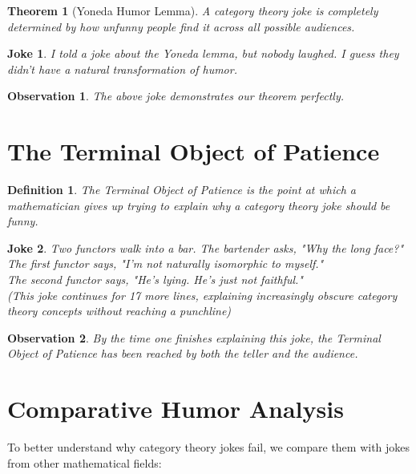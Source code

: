 \documentclass{article}
\newtheorem{theorem}{Theorem}
\newtheorem{joke}{Joke}
\newtheorem{definition}{Definition}
\newtheorem{observation}{Observation}
\begin{document}
\begin{theorem}[Yoneda Humor Lemma]
    A category theory joke is completely determined by how unfunny people find it across all possible audiences.
\end{theorem}

\begin{joke}
    I told a joke about the Yoneda lemma, but nobody laughed. I guess they didn't have a natural transformation of humor.
\end{joke}

\begin{observation}
    The above joke demonstrates our theorem perfectly.
\end{observation}

\section{The Terminal Object of Patience}

\begin{definition}
    The Terminal Object of Patience is the point at which a mathematician gives up trying to explain why a category theory joke should be funny.
\end{definition}

\begin{joke}
    Two functors walk into a bar. The bartender asks, "Why the long face?"\\
    The first functor says, "I'm not naturally isomorphic to myself."\\
    The second functor says, "He's lying. He's just not faithful."\\
    \textit{(This joke continues for 17 more lines, explaining increasingly obscure category theory concepts without reaching a punchline)}
\end{joke}

\begin{observation}
    By the time one finishes explaining this joke, the Terminal Object of Patience has been reached by both the teller and the audience.
\end{observation}

\section{Comparative Humor Analysis}

To better understand why category theory jokes fail, we compare them with jokes from other mathematical fields:
\end{document}
